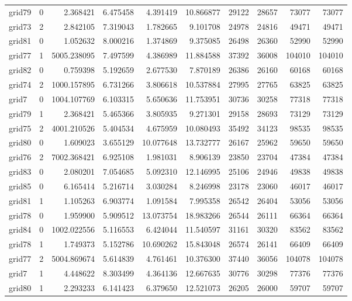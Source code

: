 \begin{longtable}{|l|r|r|r|r|r|r|r|r|r|}
grid79 & 0 & 2.368421 & 6.475458 & 4.391419 & 10.866877 & 29122 & 28657 & 73077 & 73077 \\
grid73 & 2 & 2.842105 & 7.319043 & 1.782665 & 9.101708 & 24978 & 24816 & 49471 & 49471 \\
grid81 & 0 & 1.052632 & 8.000216 & 1.374869 & 9.375085 & 26498 & 26360 & 52990 & 52990 \\
grid77 & 1 & 5005.238095 & 7.497599 & 4.386989 & 11.884588 & 37392 & 36008 & 104010 & 104010 \\
grid82 & 0 & 0.759398 & 5.192659 & 2.677530 & 7.870189 & 26386 & 26160 & 60168 & 60168 \\
grid74 & 2 & 1000.157895 & 6.731266 & 3.806618 & 10.537884 & 27995 & 27765 & 63825 & 63825 \\
grid7 & 0 & 1004.107769 & 6.103315 & 5.650636 & 11.753951 & 30736 & 30258 & 77318 & 77318 \\
grid79 & 1 & 2.368421 & 5.465366 & 3.805935 & 9.271301 & 29158 & 28693 & 73129 & 73129 \\
grid75 & 2 & 4001.210526 & 5.404534 & 4.675959 & 10.080493 & 35492 & 34123 & 98535 & 98535 \\
grid80 & 0 & 1.609023 & 3.655129 & 10.077648 & 13.732777 & 26167 & 25962 & 59650 & 59650 \\
grid76 & 2 & 7002.368421 & 6.925108 & 1.981031 & 8.906139 & 23850 & 23704 & 47384 & 47384 \\
grid83 & 0 & 2.080201 & 7.054685 & 5.092310 & 12.146995 & 25106 & 24946 & 49838 & 49838 \\
grid85 & 0 & 6.165414 & 5.216714 & 3.030284 & 8.246998 & 23178 & 23060 & 46017 & 46017 \\
grid81 & 1 & 1.105263 & 6.903774 & 1.091584 & 7.995358 & 26542 & 26404 & 53056 & 53056 \\
grid78 & 0 & 1.959900 & 5.909512 & 13.073754 & 18.983266 & 26544 & 26111 & 66364 & 66364 \\
grid84 & 0 & 1002.022556 & 5.116553 & 6.424044 & 11.540597 & 31161 & 30320 & 83562 & 83562 \\
grid78 & 1 & 1.749373 & 5.152786 & 10.690262 & 15.843048 & 26574 & 26141 & 66409 & 66409 \\
grid77 & 2 & 5004.869674 & 5.614839 & 4.761461 & 10.376300 & 37440 & 36056 & 104078 & 104078 \\
grid7 & 1 & 4.448622 & 8.303499 & 4.364136 & 12.667635 & 30776 & 30298 & 77376 & 77376 \\
grid80 & 1 & 2.293233 & 6.141423 & 6.379650 & 12.521073 & 26205 & 26000 & 59707 & 59707 \\

\end{longtable}
